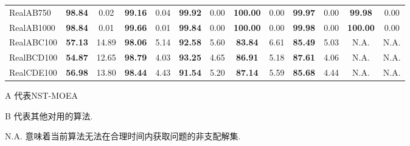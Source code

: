 \begin{table}[!h]
\begin{threeparttable}
\begin{tabular}{lcccccccccccc}
            RealAB750                     & \textbf{98.84}                & 0.02                           & \textbf{99.16}                 & 0.04                     & \textbf{99.92}              & 0.00                      & \textbf{100.00}          & 0.00   & \textbf{99.97}  & 0.00   & \textbf{99.98}  & 0.00  \\
            RealAB1000                    & \textbf{98.84}                & 0.01                           & \textbf{99.66}                 & 0.01                     & \textbf{99.84}              & 0.00                      & \textbf{100.00}          & 0.00   & \textbf{99.98}  & 0.00   & \textbf{100.00} & 0.00  \\

            RealABC100                    & \textbf{57.13}                & 14.89                          & \textbf{98.06}                 & 5.14                     & \textbf{92.58}              & 5.60                      & \textbf{83.84}           & 6.61   & \textbf{85.49}  & 5.03   & N.A.            & N.A.  \\
            RealBCD100                    & \textbf{54.87}                & 12.65                          & \textbf{98.79}                 & 4.03                     & \textbf{93.25}              & 4.65                      & \textbf{86.91}           & 5.18   & \textbf{87.61}  & 4.06   & N.A.            & N.A.  \\
            RealCDE100                    & \textbf{56.98}                & 13.80                          & \textbf{98.44}                 & 4.43                     & \textbf{91.54}              & 5.20                      & \textbf{87.14}           & 5.59   & \textbf{85.68}  & 4.44   & N.A.            & N.A.  \\
            \bottomrule
        \end{tabular}
        \begin{tablenotes}
            \item[] A 代表NST-MOEA
            \item[] B 代表其他对用的算法.
            \item[] N.A. 意味着当前算法无法在合理时间内获取问题的非支配解集.
        \end{tablenotes}
    \end{threeparttable}
\end{table}
